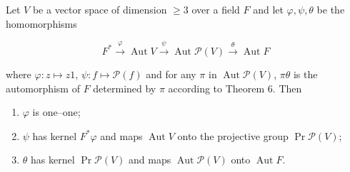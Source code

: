 Let $V$ be a vector space of dimension $\geq 3$ over a field $F$ and let $\varphi, \psi, \theta$ be the homomorphisms

$$F^* \xrightarrow{\varphi} \operatorname{Aut} V \xrightarrow{\psi} \operatorname{Aut} \mathcal{P}(V) \xrightarrow{\theta} \operatorname{Aut} F$$

where $\varphi: z \mapsto z1$, $\psi: f \mapsto \mathcal{P}(f)$ and for any $\pi$ in $\operatorname{Aut} \mathcal{P}(V)$, $\pi\theta$ is the automorphism of $F$ determined by $\pi$ according to Theorem 6. Then

\begin{enumerate}
\item[(i)] $\varphi$ is one--one;
\item[(ii)] $\psi$ has kernel $F^*\varphi$ and maps $\operatorname{Aut} V$ onto the projective group $\operatorname{Pr} \mathcal{P}(V)$;
\item[(iii)] $\theta$ has kernel $\operatorname{Pr} \mathcal{P}(V)$ and maps $\operatorname{Aut} \mathcal{P}(V)$ onto $\operatorname{Aut} F$.
\end{enumerate}
